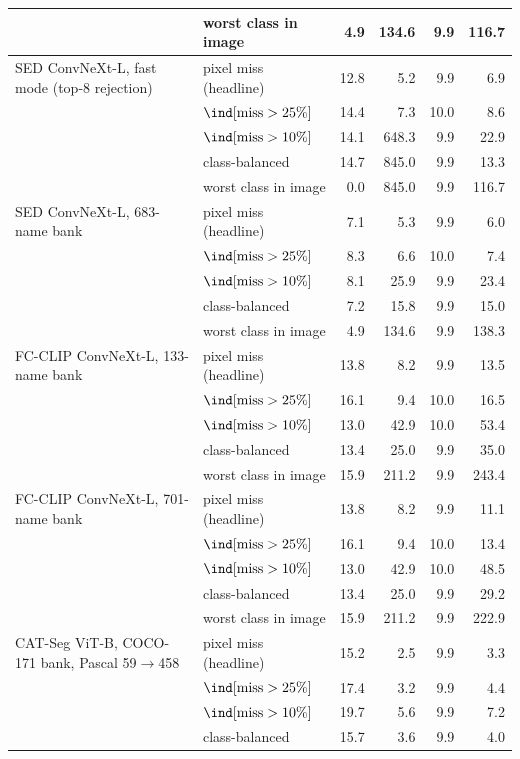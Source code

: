 \begin{tabular}{@{}llrrrr@{}}
 & worst class in image & 4.9 & 134.6 & 9.9 & 116.7 \\
\midrule
SED ConvNeXt-L, fast mode (top-8 rejection) & pixel miss (headline) & 12.8 & 5.2 & 9.9 & 6.9 \\
 & $\ind[\text{miss} > 25\%]$ & 14.4 & 7.3 & 10.0 & 8.6 \\
 & $\ind[\text{miss} > 10\%]$ & 14.1 & 648.3 & 9.9 & 22.9 \\
 & class-balanced & 14.7 & 845.0 & 9.9 & 13.3 \\
 & worst class in image & 0.0 & 845.0 & 9.9 & 116.7 \\
\midrule
SED ConvNeXt-L, 683-name bank & pixel miss (headline) & 7.1 & 5.3 & 9.9 & 6.0 \\
 & $\ind[\text{miss} > 25\%]$ & 8.3 & 6.6 & 10.0 & 7.4 \\
 & $\ind[\text{miss} > 10\%]$ & 8.1 & 25.9 & 9.9 & 23.4 \\
 & class-balanced & 7.2 & 15.8 & 9.9 & 15.0 \\
 & worst class in image & 4.9 & 134.6 & 9.9 & 138.3 \\
\midrule
FC-CLIP ConvNeXt-L, 133-name bank & pixel miss (headline) & 13.8 & 8.2 & 9.9 & 13.5 \\
 & $\ind[\text{miss} > 25\%]$ & 16.1 & 9.4 & 10.0 & 16.5 \\
 & $\ind[\text{miss} > 10\%]$ & 13.0 & 42.9 & 10.0 & 53.4 \\
 & class-balanced & 13.4 & 25.0 & 9.9 & 35.0 \\
 & worst class in image & 15.9 & 211.2 & 9.9 & 243.4 \\
\midrule
FC-CLIP ConvNeXt-L, 701-name bank & pixel miss (headline) & 13.8 & 8.2 & 9.9 & 11.1 \\
 & $\ind[\text{miss} > 25\%]$ & 16.1 & 9.4 & 10.0 & 13.4 \\
 & $\ind[\text{miss} > 10\%]$ & 13.0 & 42.9 & 10.0 & 48.5 \\
 & class-balanced & 13.4 & 25.0 & 9.9 & 29.2 \\
 & worst class in image & 15.9 & 211.2 & 9.9 & 222.9 \\
\midrule
CAT-Seg ViT-B, COCO-171 bank, Pascal 59$\to$458 & pixel miss (headline) & 15.2 & 2.5 & 9.9 & 3.3 \\
 & $\ind[\text{miss} > 25\%]$ & 17.4 & 3.2 & 9.9 & 4.4 \\
 & $\ind[\text{miss} > 10\%]$ & 19.7 & 5.6 & 9.9 & 7.2 \\
 & class-balanced & 15.7 & 3.6 & 9.9 & 4.0 \\

\end{tabular}
